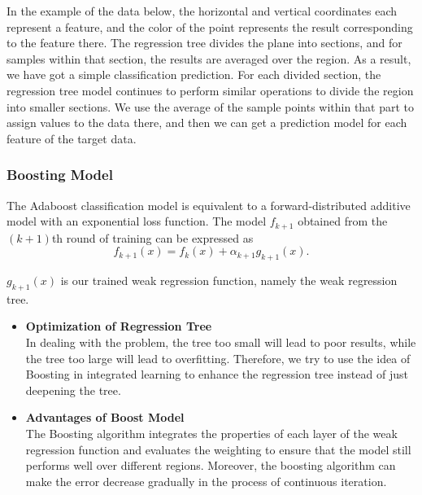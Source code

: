 \documentclass[12pt]{article}
\begin{document}
In the example of the data below, the horizontal and vertical coordinates each represent a feature, and the color of the point represents the result corresponding to the feature there.
The regression tree divides the plane into sections, and for samples within that section, the results are averaged over the region. 
As a result, we have got a simple classification prediction.
For each divided section, the regression tree model continues to perform similar operations to divide the region into smaller sections. We use the average of the sample points within that part to assign values to the data there, and then we can get a prediction model for each feature of the target data.

\subsubsection{Boosting Model}


The Adaboost classification model is equivalent to a forward-distributed additive model with an exponential loss function.
    The model $f_{k+1}$ obtained from the $(k+1)$th round of training can be expressed as
    \begin{equation}
    f_{k+1}(x) = f_{k}(x) + \alpha_{k+1}g_{k+1}(x).
    \end{equation}
    
    $g_{k+1}(x)$ is our trained weak regression function, namely the weak regression tree.
    
    \begin{itemize}
        \setlength{\parskip}{0.2pt}
        \item \textbf{Optimization of Regression Tree}\\
        In dealing with the problem, the tree too small will lead to poor results, while the tree too large will lead to overfitting. Therefore, we try to use the idea of Boosting in integrated learning to enhance the regression tree instead of just deepening the tree.
       \item \textbf{Advantages of Boost Model}\\
       The Boosting algorithm integrates the properties of each layer of the weak regression function and evaluates the weighting to ensure that the model still performs well over different regions. Moreover, the boosting algorithm can make the error decrease gradually in the process of continuous iteration.
    \end{itemize}
     
    
\end{document}
